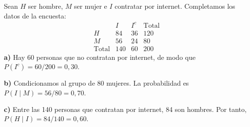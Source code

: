 Sean $H$ ser hombre, $M$ ser mujer e $I$ contratar por internet. Completamos los datos de la encuesta:
\[
 \begin{array}{c|rr|r}
 &I&I^c&\text{Total}\\\hline
 H&84&36&120\\
 M&56&24&80\\\hline
 \text{Total}&140&60&200
 \end{array}
\]
\textbf{a)} Hay 60 personas que no contratan por internet, de modo que $P(I^c)=60/200=\boxed{0{,}30}$.

\textbf{b)} Condicionamos al grupo de 80 mujeres. La probabilidad es $P(I\mid M)=56/80=\boxed{0{,}70}$.

\textbf{c)} Entre las 140 personas que contratan por internet, 84 son hombres. Por tanto, $P(H\mid I)=84/140=\boxed{0{,}60}$.
